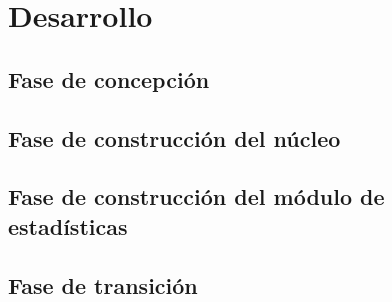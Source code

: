 \chapter{\textbf{Desarrollo}}

\thispagestyle{empty}

\section{Fase de concepción}
\section{Fase de construcción del núcleo}
\section{Fase de construcción del módulo de estadísticas}
\section{Fase de transición}
